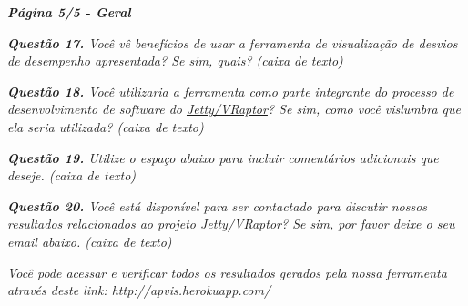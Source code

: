 \begin{framed}
	\noindent \textit{\textbf{Página 5/5 - Geral}}
	\par
	\noindent \textit{\textbf{Questão 17.} Você vê benefícios de usar a ferramenta de visualização de desvios de desempenho apresentada? Se sim, quais? (caixa de texto)}
	\par
	\noindent \textit{\textbf{Questão 18.} Você utilizaria a ferramenta como parte integrante do processo de desenvolvimento de software do \underline{Jetty/VRaptor}? Se sim, como você vislumbra que ela seria utilizada? (caixa de texto)}
	\par
	\noindent \textit{\textbf{Questão 19.} Utilize o espaço abaixo para incluir comentários adicionais que deseje. (caixa de texto)}
	\par
	\noindent \textit{\textbf{Questão 20.} Você está disponível para ser contactado para discutir nossos resultados relacionados ao projeto \underline{Jetty/VRaptor}? Se sim, por favor deixe o seu email abaixo. (caixa de texto)}

	\noindent \textit{Você pode acessar e verificar todos os resultados gerados pela nossa ferramenta através deste link: http://apvis.herokuapp.com/}
\end{framed}